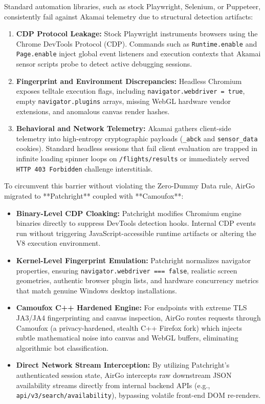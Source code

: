 \documentclass[11pt,a4paper]{article}
\begin{document}
Standard automation libraries, such as stock Playwright, Selenium, or Puppeteer, consistently fail against Akamai telemetry due to structural detection artifacts:
\begin{enumerate}[label=(\alph*)]
    \item \textbf{CDP Protocol Leakage:} Stock Playwright instruments browsers using the Chrome DevTools Protocol (CDP). Commands such as \texttt{Runtime.enable} and \texttt{Page.enable} inject global event listeners and execution contexts that Akamai sensor scripts probe to detect active debugging sessions.
    \item \textbf{Fingerprint and Environment Discrepancies:} Headless Chromium exposes telltale execution flags, including \texttt{navigator.webdriver = true}, empty \texttt{navigator.plugins} arrays, missing WebGL hardware vendor extensions, and anomalous canvas render hashes.
    \item \textbf{Behavioral and Network Telemetry:} Akamai gathers client-side telemetry into high-entropy cryptographic payloads (\texttt{\_abck} and \texttt{sensor\_data} cookies). Standard headless sessions that fail client evaluation are trapped in infinite loading spinner loops on \texttt{/flights/results} or immediately served \texttt{HTTP 403 Forbidden} challenge interstitials.
\end{enumerate}

To circumvent this barrier without violating the Zero-Dummy Data rule, AirGo migrated to **Patchright** coupled with **Camoufox**:
\begin{itemize}
    \item \textbf{Binary-Level CDP Cloaking:} Patchright modifies Chromium engine binaries directly to suppress DevTools detection hooks. Internal CDP events run without triggering JavaScript-accessible runtime artifacts or altering the V8 execution environment.
    \item \textbf{Kernel-Level Fingerprint Emulation:} Patchright normalizes navigator properties, ensuring \texttt{navigator.webdriver === false}, realistic screen geometries, authentic browser plugin lists, and hardware concurrency metrics that match genuine Windows desktop installations.
    \item \textbf{Camoufox C++ Hardened Engine:} For endpoints with extreme TLS JA3/JA4 fingerprinting and canvas inspection, AirGo routes requests through Camoufox (a privacy-hardened, stealth C++ Firefox fork) which injects subtle mathematical noise into canvas and WebGL buffers, eliminating algorithmic bot classification.
    \item \textbf{Direct Network Stream Interception:} By utilizing Patchright's authenticated session state, AirGo intercepts raw downstream JSON availability streams directly from internal backend APIs (e.g., \texttt{api/v3/search/availability}), bypassing volatile front-end DOM re-renders.
\end{itemize}
\end{document}
